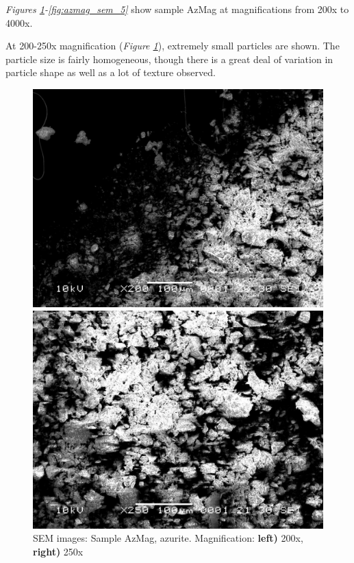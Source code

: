 \textit{Figures \ref{fig:azmag_sem_1}-\ref{fig:azmag_sem_5}} show sample AzMag at magnifications from 200x to 4000x. 

At 200-250x magnification (\textit{Figure \ref{fig:azmag_sem_1}}), extremely small particles are shown. The particle size is fairly homogeneous, though there is a great deal of variation in particle shape as well as a lot of texture observed.

\begin{figure}[H]
\centering
\begin{minipage}{.45\textwidth}
  \centering
  \includegraphics[width=\linewidth]{AzMag_x200_1_260221}
\end{minipage}
\begin{minipage}{.45\textwidth}
  \centering
  \includegraphics[width=\linewidth]{AzMag_x250_2_160321}
\end{minipage}
\caption[SEM images: Sample AzMag, azurite]{SEM images: Sample AzMag, azurite. Magnification: \textbf{left)} 200x, \textbf{right)} 250x}
\label{fig:azmag_sem_1}
\end{figure}

